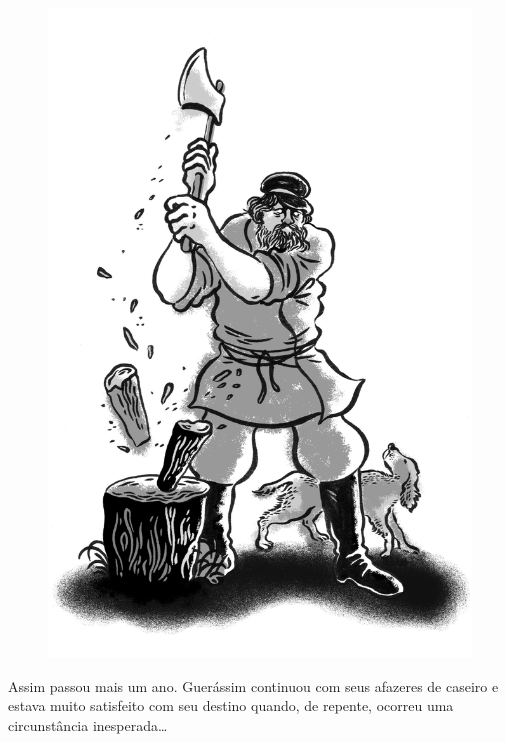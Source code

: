 \begin{figure}%
\vspace*{-1.6cm}
\hspace*{-2cm}\includegraphics[width=140mm]{./imgs/cena3.jpg}
\end{figure}

Assim passou mais um ano. Guerássim continuou com seus afazeres de
caseiro e estava muito satisfeito com seu destino quando, de repente,
ocorreu uma circunstância inesperada\ldots{}

